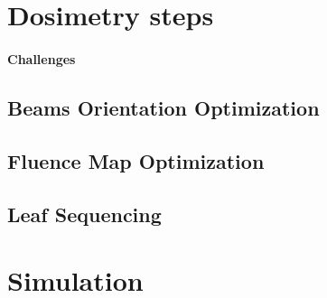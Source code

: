 \section{Dosimetry steps}
\paragraph{Challenges}
\subsection[BOO]{Beams Orientation Optimization}
\subsection[FMO]{Fluence Map Optimization}
\subsection[LS]{Leaf Sequencing}

\section{Simulation}
